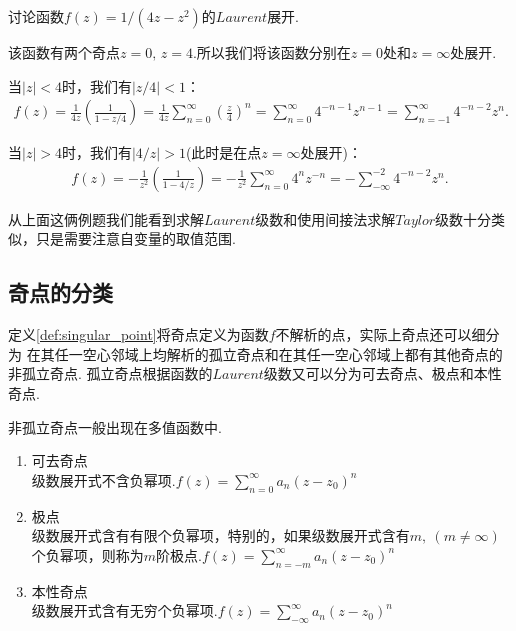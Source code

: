         \begin{example}
            讨论函数$f(z)=1/(4z-z^2)$的$Laurent$展开.
        \end{example}
        \begin{solution}
            该函数有两个奇点$z=0,\,z=4$.所以我们将该函数分别在$z=0$处和$z=\infty$处展开.

            当$|z|<4$时，我们有$|z/4|<1$：
            \begin{align*}
                f(z)=\frac{1}{4z}\left(\frac{1}{1-z/4}\right)=\frac{1}{4z}\sum_{n=0}^{\infty}\left(\frac{z}{4}\right)^n=\sum_{n=0}^{\infty}4^{-n-1}z^{n-1}=\sum_{n=-1}^{\infty}4^{-n-2}z^n.
            \end{align*}

            当$|z|>4$时，我们有$|4/z|>1$(此时是在点$z=\infty$处展开)：
            \begin{align*}
                f(z)=-\frac{1}{z^2}\left(\frac{1}{1-4/z}\right)=-\frac{1}{z^2}\sum_{n=0}^{\infty}4^nz^{-n}=-\sum_{-\infty}^{-2}4^{-n-2}z^{n}.
            \end{align*}
        \end{solution}

        从上面这俩例题我们能看到求解$Laurent$级数和使用间接法求解$Taylor$级数十分类似，只是需要注意自变量的取值范围.

    \subsection{奇点的分类}
        定义\ref{def:singular_point}将奇点定义为函数$f$不解析的点，实际上奇点还可以细分为
        在其任一空心邻域上均解析的孤立奇点和在其任一空心邻域上都有其他奇点的非孤立奇点.
        孤立奇点根据函数的$Laurent$级数又可以分为可去奇点、极点和本性奇点.

        \begin{remark}
            非孤立奇点一般出现在多值函数中.
        \end{remark}

        \begin{enumerate}
            \item 可去奇点\\
                级数展开式不含负幂项.$f(z)=\sum_{n=0}^{\infty}a_n(z-z_0)^n$
            \item 极点\\
                级数展开式含有有限个负幂项，特别的，如果级数展开式含有$m,\ (m\neq \infty)$个负幂项，则称为$m$阶极点.$f(z)=\sum_{n=-m}^{\infty}a_n(z-z_0)^n$
            \item 本性奇点\\
                级数展开式含有无穷个负幂项.$f(z)=\sum_{-\infty}^{\infty}a_n(z-z_0)^n$
        \end{enumerate}

